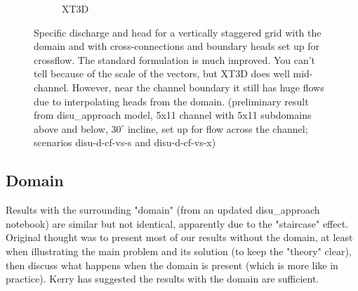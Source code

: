 \documentclass{article}
\begin{document}
\begin{figure}[H]
\begin{subfigure}{0.4\textwidth}
	\caption{XT3D}
	\label{fig:disu-x-cc-cf-head}
\end{subfigure}
\caption{Specific discharge and head for a vertically staggered grid with the domain and with cross-connections and boundary heads set up for crossflow. The standard formulation is much improved. You can't tell because of the scale of the vectors, but XT3D does well mid-channel. However, near the channel boundary it still has huge flows due to interpolating heads from the domain. (preliminary result from disu\_approach model, 5x11 channel with 5x11 subdomains above and below, $30^{\circ}$ incline, set up for flow across the channel; scenarios disu-d-cf-vs-s and disu-d-cf-vs-x)}
\label{fig:figures}
\end{figure}

\subsection{Domain}
Results with the surrounding "domain" (from an updated disu\_approach notebook) are similar but not identical, apparently due to the "staircase" effect. Original thought was to present most of our results without the domain, at least when illustrating the main problem and its solution (to keep the "theory" clear), then discuss what happens when the domain is present (which is more like in practice). Kerry has suggested the results with the domain are sufficient.
\end{document}
